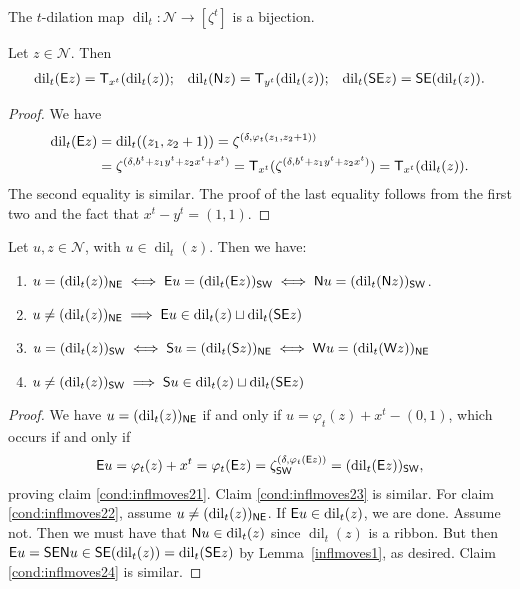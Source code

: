\documentclass[Unicode,ALCO]{cedram}
\newcommand{\infl}{\operatorname{dil}}
\newcommand{\N}{\mathcal{N}}
\newcommand{\0}{{\bar 0}}
\def\phi{{\varphi}}
\newcommand{\so}{{\sf S}}
\newcommand{\no}{{\sf N}}
\newcommand{\ea}{{\sf E}}
\newcommand{\we}{{\sf W}}
\newcommand{\T}{{\sf T}}
\newcommand{\nnee}{{\sf NE}}
\newcommand{\ssee}{{\sf SE}}
\newcommand{\ssww}{{\sf SW}}
\begin{document}
\begin{coro}\label{inflbij}
The \(t\)-dilation map \(\infl_t : \N \to [\zeta^t]\) is a bijection.
\end{coro}


\begin{lemma}\label{inflmoves1}
Let \(z \in \N\). Then 
\begin{align*}
\infl_t(\ea z) =\T_{x^t}( \infl_t(z));
\;\;\;
\infl_t(\no z) =\T_{y^t}( \infl_t(z));
\;\;\;
\infl_t(\ssee z) = \ssee(\infl_t(z)).
\end{align*}
\end{lemma}
\begin{proof}
We have
\begin{align*}
\infl_t( \ea z) &= \infl_t( (z_1, z_2 + 1)) = \zeta^{(\delta, \phi_t(z_1,z_2+1))}\\
&= \zeta^{(\delta, b^t+ z_1y^t + z_2x^t + x^t)} = \T_{x^t}(\zeta^{(\delta, b^t+ z_1y^t + z_2x^t)} ) = \T_{x^t}(\infl_t(z)).
\end{align*}
The second equality is similar. The proof of the last equality follows from the first two and the fact that \(x^t-y^t = (1,1)\).
\end{proof}

\begin{lemma}\label{inflmoves2}
Let \(u,z \in \N\), with \(u \in \infl_t(z)\). Then we have:
\begin{enumerate}
\item \(u = (\infl_t(z))_\nnee \iff \ea u = (\infl_t(\ea z))_\ssww \iff \no u = (\infl_t(\no z))_\ssww\). \label{cond:inflmoves21}
\item \(u \neq (\infl_t(z))_\nnee \implies \ea u \in \infl_t(z) \sqcup \infl_t(\ssee z)\) \label{cond:inflmoves22}
\item \(u = (\infl_t(z))_\ssww \iff \so u = (\infl_t(\so z))_\nnee \iff \we u = (\infl_t(\we z))_\nnee\) \label{cond:inflmoves23}
\item \(u \neq (\infl_t(z))_\ssww \implies \so u \in \infl_t(z) \sqcup \infl_t(\ssee z)\) \label{cond:inflmoves24}
\end{enumerate}
\end{lemma}
\begin{proof}

We have \(u = (\infl_t(z))_{\nnee}\) if and only if \(u = \phi_t(z) + x^t - (0,1)\), which occurs if and only if 
\begin{align*}
\ea u = \phi_t(z) + x^t = \phi_t(\ea z) = \zeta^{(\delta, \phi_t(\ea z))}_\ssww = (\infl_t(\ea z))_\ssww,
\end{align*}
proving claim \eqref{cond:inflmoves21}. Claim \eqref{cond:inflmoves23} is similar. For claim \eqref{cond:inflmoves22}, assume \(u \neq (\infl_t(z))_\nnee\). 
If \(\ea u \in \infl_t(z)\), we are done. Assume not. Then we must have that \(\no u \in \infl_t(z)\) since \(\infl_t(z)\) is a ribbon. But then \(\ea u = \ssee \no u \in \ssee(\infl_t(z)) = \infl_t(\ssee z)\) by Lemma~\ref{inflmoves1}, as desired. Claim \eqref{cond:inflmoves24} is similar.
\end{proof}
\end{document}
